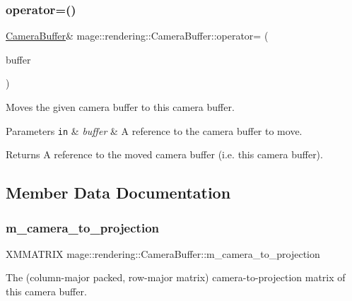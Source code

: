 \subsubsection{\texorpdfstring{operator=()}{operator=()}\hspace{0.1cm}{\footnotesize\ttfamily [2/2]}}
{\footnotesize\ttfamily \hyperlink{structmage_1_1rendering_1_1_camera_buffer}{Camera\+Buffer}\& mage\+::rendering\+::\+Camera\+Buffer\+::operator= (\begin{DoxyParamCaption}\item[{\hyperlink{structmage_1_1rendering_1_1_camera_buffer}{Camera\+Buffer} \&\&}]{buffer }\end{DoxyParamCaption})\hspace{0.3cm}{\ttfamily [default]}}

Moves the given camera buffer to this camera buffer.


\begin{DoxyParams}[1]{Parameters}
\mbox{\tt in}  & {\em buffer} & A reference to the camera buffer to move. \\
\hline
\end{DoxyParams}
\begin{DoxyReturn}{Returns}
A reference to the moved camera buffer (i.\+e. this camera buffer). 
\end{DoxyReturn}


\subsection{Member Data Documentation}
\hypertarget{structmage_1_1rendering_1_1_camera_buffer_a75669aa0916514b1d414e5a2f7c72c75}{}\label{structmage_1_1rendering_1_1_camera_buffer_a75669aa0916514b1d414e5a2f7c72c75} 
\subsubsection{\texorpdfstring{m\+\_\+camera\+\_\+to\+\_\+projection}{m\_camera\_to\_projection}}
{\footnotesize\ttfamily X\+M\+M\+A\+T\+R\+IX mage\+::rendering\+::\+Camera\+Buffer\+::m\+\_\+camera\+\_\+to\+\_\+projection}

The (column-\/major packed, row-\/major matrix) camera-\/to-\/projection matrix of this camera buffer. \hypertarget{structmage_1_1rendering_1_1_camera_buffer_a0633cfc689f2a097783ecc1626b94590}{}\label{structmage_1_1rendering_1_1_camera_buffer_a0633cfc689f2a097783ecc1626b94590} 
